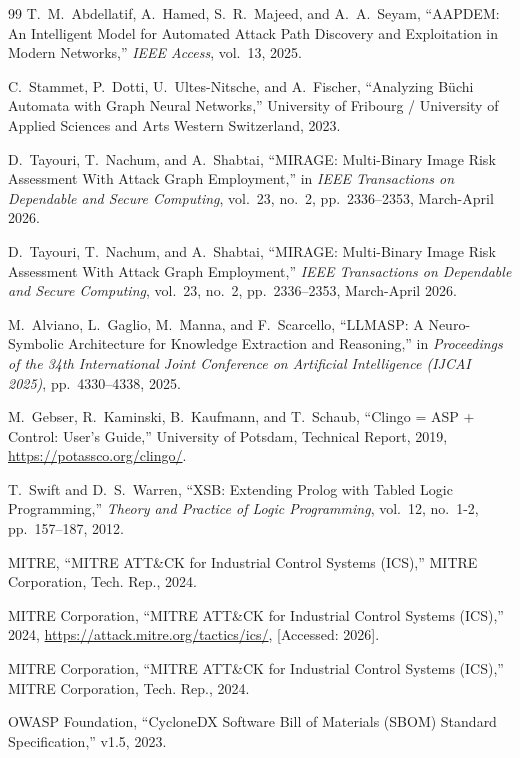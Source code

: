 \documentclass[target=mst,aauheader=aics,style=]{thud}
\begin{document}
\begin{thebibliography}{99}
T.~M.~Abdellatif, A.~Hamed, S.~R.~Majeed, and A.~A.~Seyam, 
``AAPDEM: An Intelligent Model for Automated Attack Path Discovery and Exploitation in Modern Networks,'' 
\emph{IEEE Access}, vol.~13, 2025.

C.~Stammet, P.~Dotti, U.~Ultes-Nitsche, and A.~Fischer, 
``Analyzing B\"uchi Automata with Graph Neural Networks,'' 
University of Fribourg / University of Applied Sciences and Arts Western Switzerland, 2023.

D.~Tayouri, T.~Nachum, and A.~Shabtai, 
``MIRAGE: Multi-Binary Image Risk Assessment With Attack Graph Employment,'' 
in \emph{IEEE Transactions on Dependable and Secure Computing}, vol.~23, no.~2, pp.~2336--2353, March-April 2026.

D.~Tayouri, T.~Nachum, and A.~Shabtai,
``MIRAGE: Multi-Binary Image Risk Assessment With Attack Graph Employment,''
\emph{IEEE Transactions on Dependable and Secure Computing}, vol.~23, no.~2, pp.~2336--2353, March-April 2026.

M.~Alviano, L.~Gaglio, M.~Manna, and F.~Scarcello,
``LLMASP: A Neuro-Symbolic Architecture for Knowledge Extraction and Reasoning,''
in \emph{Proceedings of the 34th International Joint Conference on Artificial Intelligence (IJCAI 2025)}, pp.~4330--4338, 2025.

M.~Gebser, R.~Kaminski, B.~Kaufmann, and T.~Schaub,
``Clingo = ASP + Control: User's Guide,''
University of Potsdam, Technical Report, 2019, \url{https://potassco.org/clingo/}.

T.~Swift and D.~S.~Warren,
``XSB: Extending Prolog with Tabled Logic Programming,''
\emph{Theory and Practice of Logic Programming}, vol.~12, no.~1-2, pp.~157--187, 2012.

MITRE,
``MITRE ATT\&CK for Industrial Control Systems (ICS),''
MITRE Corporation, Tech. Rep., 2024.

{MITRE Corporation},
``{MITRE ATT\&CK for Industrial Control Systems (ICS)},''
2024, \url{https://attack.mitre.org/tactics/ics/}, [Accessed: 2026].

{MITRE Corporation},
``{MITRE ATT\&CK for Industrial Control Systems (ICS)},''
MITRE Corporation, Tech. Rep., 2024.

OWASP Foundation,
``CycloneDX Software Bill of Materials (SBOM) Standard Specification,''
v1.5, 2023.


\end{thebibliography}
\end{document}

